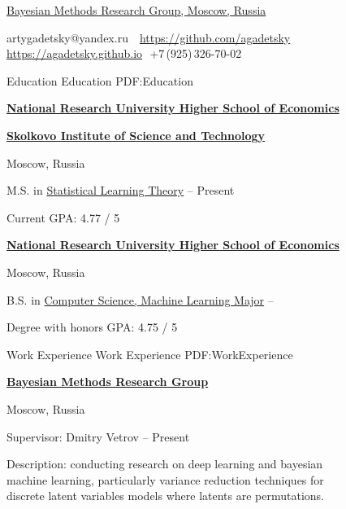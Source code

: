 \documentclass[letterpaper,MMMyyyy,nonstopmode]{simpleresumecv}
\newcommand{\CVAuthor}{Artyom Gadetsky}
\begin{document}

\Title{\CVAuthor}

\begin{SubTitle}
\href{http://bayesgroup.ru}{Bayesian Methods Research Group, Moscow, Russia}
\par
artygadetsky@yandex.ru
\,\SubBulletSymbol\,
\href{https://github.com/agadetsky}{https://github.com/agadetsky}
\,\SubBulletSymbol\,\href{https://agadetsky.github.io}{https://agadetsky.github.io}\,\SubBulletSymbol\,
+7\,(925)\,326-70-02
\end{SubTitle}

\begin{Body}


\Section
{Education}
{Education}
{PDF:Education}

\Entry
\href{https://www.hse.ru/en/}
{\textbf{National Research University Higher School of Economics}}
\par
\href{https://www.skoltech.ru/en/}{\textbf{Skolkovo Institute of Science and Technology}}
\par
Moscow, Russia

\Gap
\BulletItem
M.S. in
\href{https://www.hse.ru/en/ma/sltheory/}
{Statistical Learning Theory}
\hfill
{} --
Present
\begin{Detail}
\SubBulletItem
Current GPA: 4.77 / 5
\end{Detail}
\Gap

\Entry
\href{https://www.hse.ru/en/}
{\textbf{National Research University Higher School of Economics}}
\par
Moscow, Russia

\Gap
\BulletItem
B.S. in
\href{https://www.hse.ru/en/ba/ami/}
{Computer Science, Machine Learning Major}
\hfill
{} --
\begin{Detail}
\SubBulletItem
Degree with honors
\SubBulletItem
GPA: 4.75 / 5
\end{Detail}


\Section
{Work Experience}
{Work Experience}
{PDF:WorkExperience}

\Entry
\href{http://bayesgroup.ru}
{\textbf{Bayesian Methods Research Group}}
\par
Moscow, Russia

\Gap
\BulletItem
Supervisor: Dmitry Vetrov
\hfill
{} --
Present
\begin{Detail}
\SubBulletItem
Description: conducting research on deep learning and bayesian\\ machine learning, particularly variance reduction techniques for\\ discrete latent variables models where latents are permutations. 
\end{Detail}


\end{Body}
\end{document}
